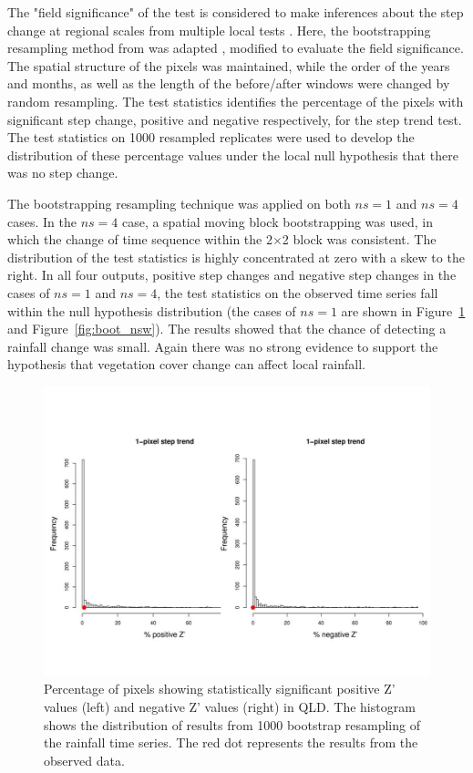 \documentclass[draft,linenumbers]{agujournal}
\begin{document}
\begin{article}
The "field significance" of the test is considered to make inferences about the step change at regional scales from multiple local tests \citep{Wilks2006,Westra2013}. Here, the bootstrapping resampling method from \citet{Westra2013} was adapted , modified to evaluate the field significance. The spatial structure of the pixels was maintained, while the order of the years and months, as well as the length of the before/after windows were changed by random resampling. The test statistics identifies the percentage of the pixels with significant step change, positive and negative respectively, for the step trend test. The test statistics on 1000 resampled replicates were used to develop the distribution of these percentage values under the local null hypothesis that there was no step change.

The bootstrapping resampling technique was applied on both $ns=1$ and $ns=4$ cases. In the $ns=4$ case, a spatial moving block bootstrapping was used, in which the change of time sequence within the 2$\times$2 block was consistent. The distribution of the test statistics is highly concentrated at zero with a skew to the right. In all four outputs, positive step changes and negative step changes in the cases of $ns=1$ and $ns=4$, the test statistics on the observed time series fall within the null hypothesis distribution (the cases of $ns=1$ are shown in Figure~\ref{fig:boot_qld} and Figure~\ref{fig:boot_nsw}). The results showed that the chance of detecting a rainfall change was small. Again there was no strong evidence to support the hypothesis that vegetation cover change can affect local rainfall.

\begin{figure}[ht]
\centering
\includegraphics[width=6.5in]{bt1_qld.jpg}
\caption{Percentage of pixels showing statistically significant positive Z' values (left) and negative Z' values (right) in QLD. The histogram shows the distribution of results from 1000 bootstrap resampling of the rainfall time series. The red dot represents the results from the observed data.}
\label{fig:boot_qld}
\end{figure}


\end{article}
\end{document}
